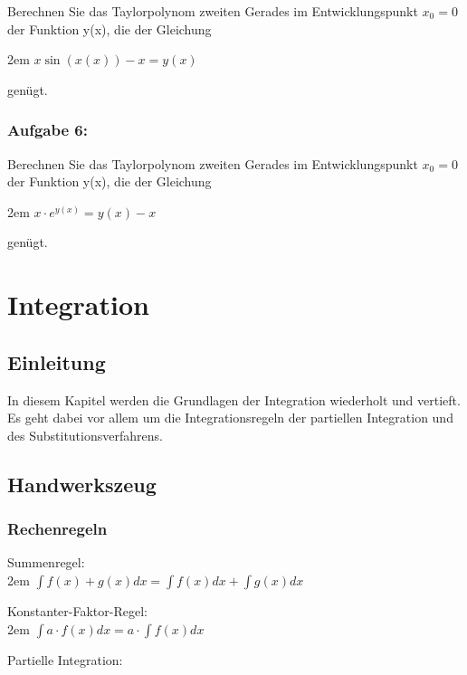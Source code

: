 \documentclass[11pt,final]{scrreprt}
\begin{document}
Berechnen Sie das Taylorpolynom zweiten Gerades im Entwicklungspunkt $x_0=0$ der Funktion y(x), die der Gleichung 

\begingroup
\leftskip2em 
$ x\sin(x(x))-x=y(x) $
\par	
\endgroup 

genügt. 

\subsection*{Aufgabe 6:}

Berechnen Sie das Taylorpolynom zweiten Gerades im Entwicklungspunkt $x_0=0$ der Funktion y(x), die der Gleichung 

\begingroup
\leftskip2em 
$ x\cdot e^{y(x)} = y(x) - x $
\par	
\endgroup 

genügt. 


\chapter{Integration}

\section{Einleitung}
In diesem Kapitel werden die Grundlagen der Integration wiederholt und vertieft. Es geht dabei vor allem um die Integrationsregeln der partiellen Integration und des Substitutionsverfahrens. 
\section{Handwerkszeug}
\subsection*{Rechenregeln}

Summenregel:\\

\begingroup
\leftskip2em 
$ \int f(x) + g(x) dx = \int f(x) dx +\int g(x) dx  $\\
\par	
\endgroup 

Konstanter-Faktor-Regel:\\

\begingroup
\leftskip2em 
$ \int a \cdot f(x) dx = a \cdot \int f(x) dx $\\
\par	
\endgroup 

Partielle Integration:\\
\end{document}
